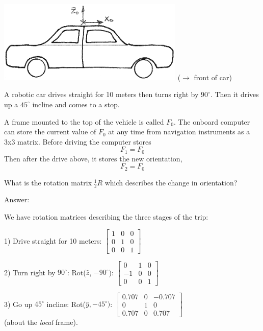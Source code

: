 \begin{Example}

\begin{center}
\includegraphics[width=3.5in]{figs02/00708.eps} ($\to$ front of car)
\end{center}
\vspace{0.2in}
A robotic car drives straight for 10 meters then turns right by $90^\circ$.  Then it drives up  a $45^\circ$ incline and comes to a stop.

A frame mounted to the top of the vehicle is called $F_0$.
The onboard computer can store the current value of $F_0$ at any time from navigation instruments as a 3x3 matrix.  Before driving the computer stores
\[
F_1 = F_0
\]
Then after the drive above, it stores the new orientation,
\[
F_2 = F_0
\]


What is the rotation matrix ${^1_2R}$ which describes the change in orientation?

Answer:

We have rotation matrices describing the three stages of the trip:

1) Drive straight for 10 meters:  $\begin{bmatrix}  1 & 0 & 0 \\ 0 & 1 & 0 \\ 0 & 0 & 1 \end{bmatrix}$

2) Turn right by $90^\circ$: Rot($\hat{z}$,  $-90^\circ$):  $\begin{bmatrix} 0 & 1 & 0 \\ -1 & 0 & 0 \\ 0 & 0 & 1 \end{bmatrix}$

3) Go up $45^\circ$ incline: Rot($\hat{y}, -45^\circ)$:  $\begin{bmatrix} 0.707 & 0  & -0.707 \\ 0 & 1 & 0 \\ 0.707 & 0 & 0.707 \end{bmatrix}$\\
(about the {\it local } frame).


\end{Example}
